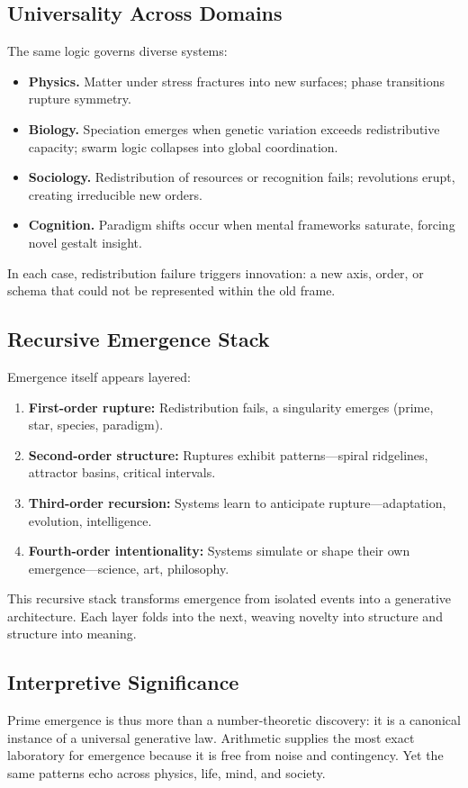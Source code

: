 \documentclass[11pt]{article}
\theoremstyle{plain}
\theoremstyle{definition}
\begin{document}
\subsection{Universality Across Domains}
The same logic governs diverse systems:
\begin{itemize}
  \item \textbf{Physics.} Matter under stress fractures into new surfaces; phase transitions rupture symmetry.  
  \item \textbf{Biology.} Speciation emerges when genetic variation exceeds redistributive capacity; swarm logic collapses into global coordination.  
  \item \textbf{Sociology.} Redistribution of resources or recognition fails; revolutions erupt, creating irreducible new orders.  
  \item \textbf{Cognition.} Paradigm shifts occur when mental frameworks saturate, forcing novel gestalt insight.  
\end{itemize}
In each case, redistribution failure triggers innovation: a new axis, order, or schema that could not be represented within the old frame.

\subsection{Recursive Emergence Stack}
Emergence itself appears layered:
\begin{enumerate}
  \item \textbf{First-order rupture:} Redistribution fails, a singularity emerges (prime, star, species, paradigm).  
  \item \textbf{Second-order structure:} Ruptures exhibit patterns—spiral ridgelines, attractor basins, critical intervals.  
  \item \textbf{Third-order recursion:} Systems learn to anticipate rupture—adaptation, evolution, intelligence.  
  \item \textbf{Fourth-order intentionality:} Systems simulate or shape their own emergence—science, art, philosophy.  
\end{enumerate}
This recursive stack transforms emergence from isolated events into a generative architecture. Each layer folds into the next, weaving novelty into structure and structure into meaning.

\subsection{Interpretive Significance}
Prime emergence is thus more than a number-theoretic discovery: it is a canonical instance of a universal generative law. Arithmetic supplies the most exact laboratory for emergence because it is free from noise and contingency. Yet the same patterns echo across physics, life, mind, and society.
\end{document}
